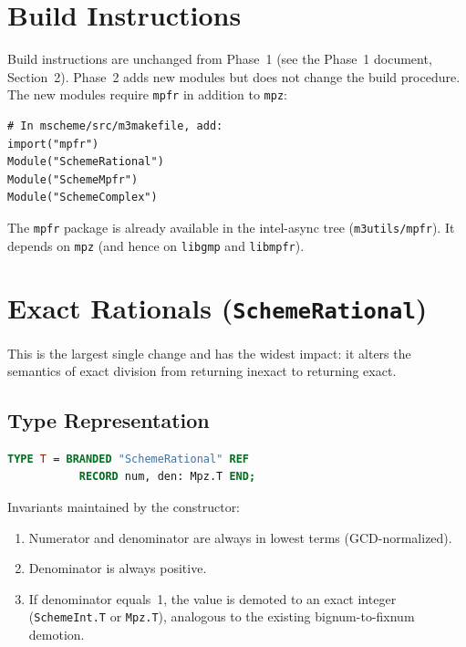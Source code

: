 \documentclass[12pt]{article}
\begin{document}
\section{Build Instructions}
\label{sec:build}

Build instructions are unchanged from Phase~1 (see the Phase~1
document, Section~2).  Phase~2 adds new modules but does not change
the build procedure.  The new modules require {\tt mpfr} in
addition to {\tt mpz}:

\begin{lstlisting}[language={}]
# In mscheme/src/m3makefile, add:
import("mpfr")
Module("SchemeRational")
Module("SchemeMpfr")
Module("SchemeComplex")
\end{lstlisting}

\noindent The {\tt mpfr} package is already available in the
intel-async tree ({\tt m3utils/mpfr}).  It depends on {\tt mpz}
(and hence on {\tt libgmp} and {\tt libmpfr}).

\section{Exact Rationals ({\tt SchemeRational})}
\label{sec:rational}

This is the largest single change and has the widest impact: it
alters the semantics of exact division from returning inexact to
returning exact.

\subsection{Type Representation}

\begin{lstlisting}[language=Modula3]
TYPE T = BRANDED "SchemeRational" REF
           RECORD num, den: Mpz.T END;
\end{lstlisting}

\noindent Invariants maintained by the constructor:
\begin{enumerate}[nosep]
\item Numerator and denominator are always in lowest terms
  (GCD-normalized).
\item Denominator is always positive.
\item If denominator equals~1, the value is demoted to an exact
  integer ({\tt SchemeInt.T} or {\tt Mpz.T}), analogous to the
  existing bignum-to-fixnum demotion.
\end{enumerate}
\end{document}
